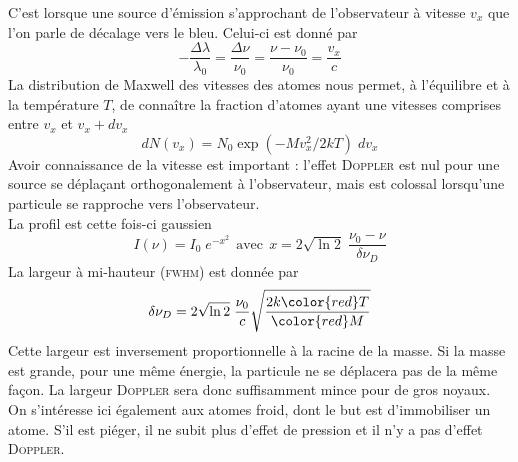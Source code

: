 C'est lorsque une source d'émission s'approchant de l'observateur à vitesse $v_x$ que l'on parle
de décalage vers le bleu. Celui-ci est donné par
\begin{equation}
- \frac{\Delta \lambda }{\lambda_0} =
\frac{\Delta \nu}{\nu_0} = \frac{ \nu - \nu_0 }{\nu_0}  
= \frac{v_x}{c}
\end{equation}
La distribution de Maxwell des vitesses des atomes nous permet, à l'équilibre et à la température
$T$, de connaître la fraction d'atomes ayant une vitesses comprises entre $v_x$ et $v_x+dv_x$
\begin{equation}
dN(v_x) = N_0 \exp (-M v_x^2 /2kT) \; dv_x
\end{equation}
Avoir connaissance de la vitesse est important : l'effet \textsc{Doppler} est nul pour une source 
se déplaçant orthogonalement à l'observateur, mais est colossal lorsqu'une particule se rapproche
vers l'observateur.\\

La profil est cette fois-ci gaussien
\begin{equation}
I(\nu) =  I_0 \; e^{-x^2}~~\mbox{avec}~~
x = 2 \sqrt{\ln 2} \; \frac{\nu_0 - \nu}{\delta \nu_D}
\end{equation}
La largeur à mi-hauteur (\textsc{fwhm}) est donnée par
\begin{equation}
\delta \nu_D = 
2 \sqrt{\ln 2} \; \frac{\nu_0}{c} 
 \sqrt {\frac{2 k{\color{red} T}}
{ {\color{red} M} }}
\end{equation}
Cette largeur est inversement proportionnelle à la racine de la masse. Si la masse est grande, pour
une même énergie, la particule ne se déplacera pas de la même façon. La largeur \textsc{Doppler} sera
donc suffisamment mince pour de gros noyaux. On s'intéresse ici également aux atomes froid, dont le
but est d'immobiliser un atome. S'il est piéger, il ne subit plus d'effet de pression et il n'y a 
pas d'effet \textsc{Doppler}.\\


